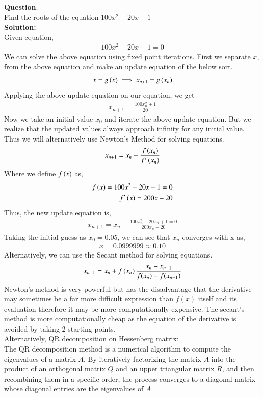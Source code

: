 \documentclass[journal]{IEEEtran}
\begin{document}
	
\textbf{Question}:\\
Find the roots of the equation \( 100x^2-20x+1 \)
\\
\textbf{Solution: }\\
Given equation,
\begin{align}
100x^2-20x+1=0
\end{align}
We can solve the above equation using fixed point iterations. First we separate $x$, from the above equation and make an update equation of the below sort.
\begin{align}
	x = g\left(x\right) \implies x_{n+1} = g\left(x_n\right)
\end{align}
Applying the above update equation on our equation, we get
\begin{align}
	x_{n+1} = 	\frac{100x_n^2+1}{20}
\end{align}
Now we take an initial value $x_0$ and iterate the above update equation. But we realize that the updated values always approach infinity for any initial value. \\
Thus we will alternatively use Newton's Method for solving equations.
\begin{align}
	x_{n+1} = x_n - \frac{f\left(x_n\right)}{f^{\prime}\left(x_n\right)} 
\end{align}
Where we define $f\left(x\right)$ as, 
\begin{align}
	f\left(x\right) = 100x^2-20x+1=0 \\
	f^{\prime}\left(x\right) = 200x-20 
\end{align}
Thus, the new update equation is, 
\begin{align}
	x_{n+1} = x_n - \frac{100x_n^2-20x_n+1=0}{200x_n-20 } 
\end{align}
Taking the initial guess as $x_0 = 0.05$, we can see that $x_n$ converges with x as,
\begin{align}
	x = 0.0999999 \approx 0.10
\end{align}
Alternatively, we can use the Secant method for solving equations.
\begin{align}
	x_{n+1} = x_n + f\left(x_n\right)\frac{x_{n} -  x_{n-1}}{f(x_{n}) -  f(x_{n-1})}
\end{align}
Newton's method is very powerful but has the disadvantage that the derivative may sometimes be a far more difficult expression than \(f(x)\) itself and its evaluation therefore it may be more computationally expensive. The secant's method is more computationally cheap as the equation of the derivative is avoided by taking 2 starting points.\\
Alternatively, QR decomposition on Hessenberg matrix:\\
The QR decomposition method is a numerical algorithm to compute the eigenvalues of a matrix \( A \). By iteratively factorizing the matrix \( A \) into the product of an orthogonal matrix \( Q \) and an upper triangular matrix \( R \), and then recombining them in a specific order, the process converges to a diagonal matrix whose diagonal entries are the eigenvalues of \( A \).
\end{document}

